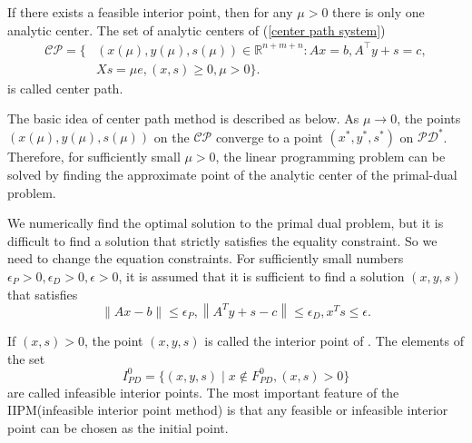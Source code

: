 If there exists a feasible interior point, then for any $\mu > 0$ there is only one analytic center. The set of analytic centers of (\ref{center path system})
\begin{align}
    \mathcal{CP} = \{ &(x(\mu), y(\mu), s(\mu)) \in \mathbb{R}^{n+m+n}: A x = b, A^{\top} y + s = c, \\
    &X s=\mu e, (x,s) \geq 0, \mu > 0\}.
\end{align}
is called center path.

The basic idea of center path method is described as below. As $\mu \rightarrow 0$, the points $(x(\mu), y(\mu), s(\mu))$ on the $\mathcal{CP}$ converge to a point $(x^*, y^*, s^*)$ on $\mathcal{PD^*}$. Therefore, for sufficiently small $\mu > 0$, the linear programming problem can be solved by finding the approximate point of the analytic center of the primal-dual problem.

We numerically find the optimal solution to the primal dual problem, but it is difficult to find a solution that strictly satisfies the equality constraint. So we need to change the equation constraints. For sufficiently small numbers $\epsilon_P>0, \epsilon_D>0, \epsilon>0$, it is assumed that it is sufficient to find a solution $(x,y,s)$ that satisfies 
\begin{equation}
    \| A  x- b\| \leq \epsilon_P,\left\| A^T  y+ s- c\right\| \leq \epsilon_D,  x^T  s \leq \epsilon.
\end{equation}

If $(x,s)>0$, the point $(x,y,s)$ is called the interior point of . The elements of the set
\begin{equation}
    I_{PD}^0 = \{(x,y,s) \mid x\notin F_{PD}^{0}, (x,s)>0\}
\end{equation}
are called infeasible interior points. The most important feature of the IIPM(infeasible interior point method) is that any feasible or infeasible interior point can be chosen as the initial point.

